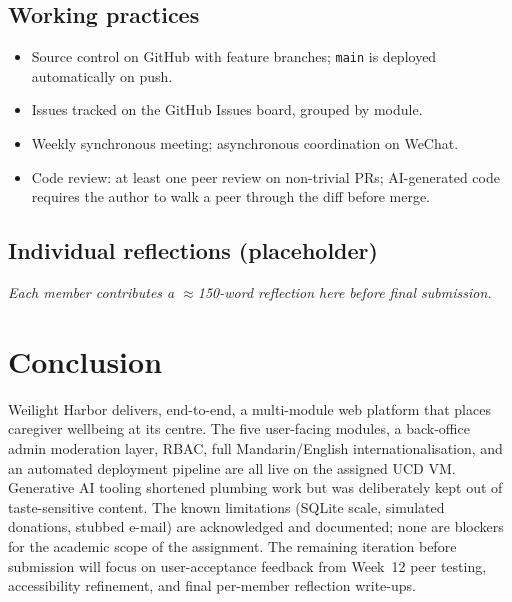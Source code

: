 \subsection{Working practices}
\begin{itemize}
  \item Source control on GitHub with feature branches; \texttt{main} is
        deployed automatically on push.
  \item Issues tracked on the GitHub Issues board, grouped by module.
  \item Weekly synchronous meeting; asynchronous coordination on
        WeChat.
  \item Code review: at least one peer review on non-trivial PRs;
        AI-generated code requires the author to walk a peer through the
        diff before merge.
\end{itemize}

\subsection{Individual reflections (placeholder)}
\textit{Each member contributes a $\approx$150-word reflection here
before final submission.}

\section{Conclusion}\label{sec:concl}

Weilight Harbor delivers, end-to-end, a multi-module web platform that
places caregiver wellbeing at its centre. The five user-facing modules,
a back-office admin moderation layer, RBAC, full Mandarin/English
internationalisation, and an automated deployment pipeline are all live
on the assigned UCD VM. Generative AI tooling shortened plumbing work
but was deliberately kept out of taste-sensitive content. The known
limitations (SQLite scale, simulated donations, stubbed e-mail) are
acknowledged and documented; none are blockers for the academic scope
of the assignment. The remaining iteration before submission will focus
on user-acceptance feedback from Week~12 peer testing, accessibility
refinement, and final per-member reflection write-ups.

\appendix
